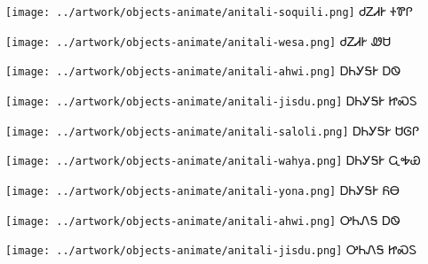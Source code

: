 \documentclass[avery5371,frame]{flashcards}%
\begin{document}
\begin{flashcard}{
\texttt{[image: ../artwork/objects-animate/anitali-soquili.png]}
}\Huge ᏧᏃᏗᎨ ᏐᏈᎵ
\end{flashcard}

\begin{flashcard}{
\texttt{[image: ../artwork/objects-animate/anitali-wesa.png]}
}\Huge ᏧᏃᏗᎨ ᏪᏌ
\end{flashcard}

\begin{flashcard}{
\texttt{[image: ../artwork/objects-animate/anitali-ahwi.png]}
}\Huge ᎠᏂᎩᎦᎨ ᎠᏫ
\end{flashcard}

\begin{flashcard}{
\texttt{[image: ../artwork/objects-animate/anitali-jisdu.png]}
}\Huge ᎠᏂᎩᎦᎨ ᏥᏍᏚ
\end{flashcard}

\begin{flashcard}{
\texttt{[image: ../artwork/objects-animate/anitali-saloli.png]}
}\Huge ᎠᏂᎩᎦᎨ ᏌᎶᎵ
\end{flashcard}

\begin{flashcard}{
\texttt{[image: ../artwork/objects-animate/anitali-wahya.png]}
}\Huge ᎠᏂᎩᎦᎨ ᏩᎭᏯ
\end{flashcard}

\begin{flashcard}{
\texttt{[image: ../artwork/objects-animate/anitali-yona.png]}
}\Huge ᎠᏂᎩᎦᎨ ᏲᎾ
\end{flashcard}

\begin{flashcard}{
\texttt{[image: ../artwork/objects-animate/anitali-ahwi.png]}
}\Huge ᎤᏂᏁᎦ ᎠᏫ
\end{flashcard}

\begin{flashcard}{
\texttt{[image: ../artwork/objects-animate/anitali-jisdu.png]}
}\Huge ᎤᏂᏁᎦ ᏥᏍᏚ
\end{flashcard}
\end{document}
